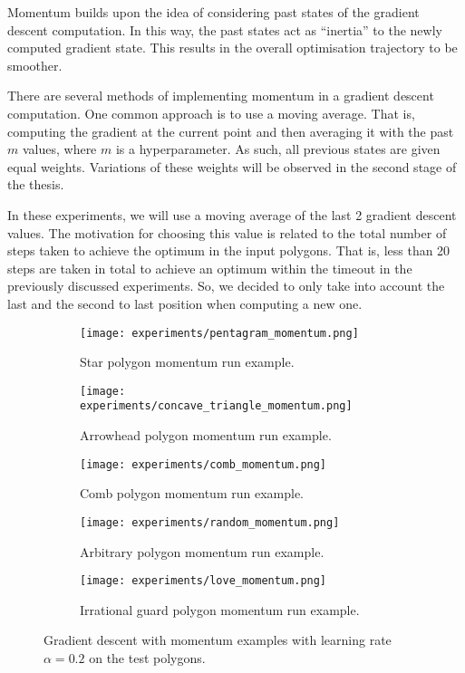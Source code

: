 Momentum \cite{goodfelow2016deep} builds upon the idea of considering past states of the gradient descent computation. In this way, the past states act as ``inertia'' to the newly computed gradient state. This results in the overall optimisation trajectory to be smoother. 

There are several methods of implementing momentum in a gradient descent computation. One common approach is to use a moving average. That is, computing the gradient at the current point and then averaging it with the past $m$ values, where $m$ is a hyperparameter. As such, all previous states are given equal weights. Variations of these weights will be observed in the second stage of the thesis.

In these experiments, we will use a moving average of the last 2 gradient descent values. The motivation for choosing this value is related to the total number of steps taken to achieve the optimum in the input polygons. That is, less than 20 steps are taken in total to achieve an optimum within the timeout in the previously discussed experiments. So, we decided to only take into account the last and the second to last position when computing a new one.

\begin{figure}[h!]
    \centering
    \begin{subfigure}{0.45\textwidth}
        \centering
        \texttt{[image: experiments/pentagram\_momentum.png]}
        \caption{Star polygon momentum run example.}
        \label{fig:star_momentum}
    \end{subfigure}
    \begin{subfigure}{0.45\textwidth}
        \centering
        \texttt{[image: experiments/concave\_triangle\_momentum.png]}
        \caption{Arrowhead polygon momentum run example.}
        \label{fig:concave_momentum}
    \end{subfigure}
    \begin{subfigure}{0.45\textwidth}
        \centering
        \texttt{[image: experiments/comb\_momentum.png]}
        \caption{Comb polygon momentum run example.}
        \label{fig:comb_momentum}
    \end{subfigure}
    \begin{subfigure}{0.45\textwidth}
        \centering
        \texttt{[image: experiments/random\_momentum.png]}
        \caption{Arbitrary polygon momentum run example.}
        \label{fig:random_momentum}
    \end{subfigure}
    \begin{subfigure}{\textwidth}
        \centering
        \texttt{[image: experiments/love\_momentum.png]}
        \caption{Irrational guard polygon momentum run example.}
        \label{fig:love_momentum}
    \end{subfigure}
    \caption{Gradient descent with momentum examples with learning rate $\alpha = 0.2$ on the test polygons.}
    \label{fig:momentums}
\end{figure}

